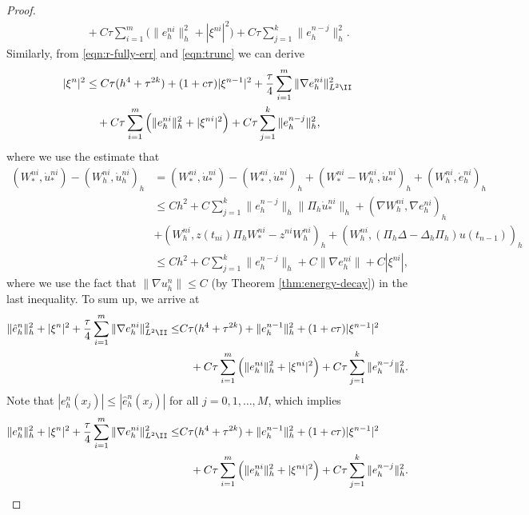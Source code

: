 \begin{proof}
\begin{equation}
\begin{split}
&\quad + C \tau   \sum_{i=1}^m \Big(\|  e_h^{ni} \|_h^2+ |\xi^{ni}|^2 \Big)
+ C\tau  \sum_{j=1}^{k} \|  e_h^{n-j} \|_h^2.
\end{split}
\end{equation}
Similarly, from \eqref{eqn:r-fully-err} and \eqref{eqn:trunc} we can derive
\begin{equation*}
\begin{split}
|\xi^n|^2 &\le C\tau(h^4+ \tau^{2k}) + (1+c \tau) |\xi^{n-1}|^2 + \frac \tau4 \sum_{i=1}^m \| \nabla e_h^{ni} \|_{L^2\II}^2 \\
&\quad + C \tau   \sum_{i=1}^m \Big(\|  e_h^{ni} \|_h^2+ |\xi^{ni}|^2 \Big)
+ C\tau  \sum_{j=1}^{k} \|  e_h^{n-j} \|_h^2,
\end{split}
\end{equation*}
where we use the estimate that
\begin{align*}
  (W_*^{ni} ,   \dot u_*^{ni}) -  (W_h^{ni} ,   \dot u_h^{ni})_h &=  (W_*^{ni} ,   \dot u_*^{ni})  -  (W_*^{ni} ,   \dot u_*^{ni}) _h
   + (W_*^{ni}-W_h^{ni},  \dot u_*^{ni})_h + (W_h^{ni},  \dot e_h^{ni} )_h \\
  & \le C h^{2} + C\sum_{j=1}^k \|  e_h^{n-j} \|_h \|  \Pi_h \dot u_*^{ni} \|_h + (\nabla W_h^{ni},  \nabla  e_h^{ni} )_h\\
 &+ ( W_h^{ni}, z(t_{ni}) \Pi_h W_*^{ni} - z^{ni} W_h^{ni} )_h
  +  ( W_h^{ni}, (\Pi_h \Delta - \Delta_h \Pi_h) u(t_{n-1}) )_h \\
 & \le C h^{2} + C\sum_{j=1}^k \|  e_h^{n-j} \|_h + C \| \nabla  e_h^{ni} \|  + C|\xi^{ni}|,
\end{align*}
where we use the fact that $ \| \nabla u_h^{n} \|\le C$ (by Theorem \ref{thm:energy-decay}) in the last inequality. To sum up, we arrive at
\begin{equation*}
\begin{split}
 \|\hat e_h^{n}\|_h^2 + |\xi^n|^2 + \frac\tau4 \sum_{i=1}^m \| \nabla e_h^{ni} \|_{L^2\II}^2
 \le&  C\tau(h^4+ \tau^{2k}) +  \|e_h^{n-1}\|_h^2 + (1+c \tau) |\xi^{n-1}|^2   \\
&\quad + C \tau   \sum_{i=1}^m \Big(\|  e_h^{ni} \|_h^2+ |\xi^{ni}|^2 \Big)
+ C\tau  \sum_{j=1}^{k} \|  e_h^{n-j} \|_h^2.
\end{split}
\end{equation*}
Note that $| e_h^{n}(x_j)| \le |\hat e_h^{n}(x_j)|$ for all $j=0,1,\ldots,M$, which implies
\begin{equation}\label{eqn:sav-est-02}
\begin{split}
 \|e_h^{n}\|_h^2 + |\xi^n|^2 + \frac\tau4 \sum_{i=1}^m \| \nabla e_h^{ni} \|_{L^2\II}^2
 \le&  C\tau(h^4+ \tau^{2k}) +  \|e_h^{n-1}\|_h^2 + (1+c \tau) |\xi^{n-1}|^2   \\
&\quad + C \tau   \sum_{i=1}^m \Big(\|  e_h^{ni} \|_h^2+ |\xi^{ni}|^2 \Big)
+ C\tau  \sum_{j=1}^{k} \|  e_h^{n-j} \|_h^2.
\end{split}
\end{equation}


\end{proof}

